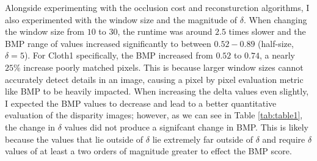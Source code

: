 \documentclass[11pt,a4paper]{article}
\begin{document}
Alongside experimenting with the occlusion cost and reconsturction algorithms, I also experimented with the window size and the magnitude of $\delta$.
When changing the window size from $10$ to $30$, the runtime was around $2.5$ times slower and the BMP range of values increased significantly to between
 $0.52-0.89$ (half-size, $\delta = 5$). For Cloth1 specifically, the BMP increased from $0.52$ to $0.74$, a nearly $25\%$ increase poorly matched pixels. This is because
 larger window sizes cannot accurately detect details in an image, causing a pixel by pixel evaluation metric like BMP to be heavily impacted.
 When increasing the delta values even slightly, I expected the BMP values to decrease and lead to a better quantitative evaluation of the disparity images; however, as we can see in Table 
 \ref{tab:table1}, the change in $\delta$ values did not produce a signifcant change in BMP.  This is likely because the values 
 that lie outside of $\delta$ lie extremely far outside of $\delta$ and require $\delta$ values of at least a two orders of magnitude
 greater to effect the BMP score.

\printbibliography
\end{document}
